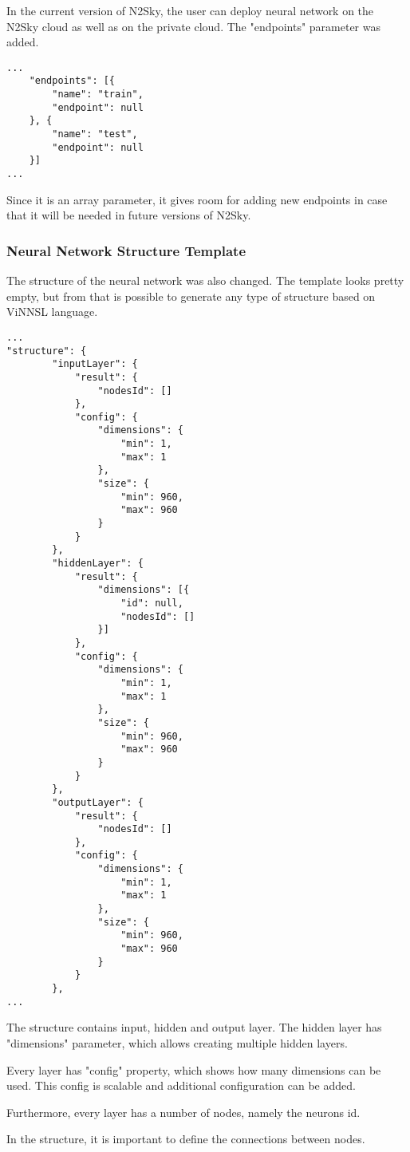 In the current version of N2Sky, the user can deploy neural network on the N2Sky cloud as well as on the private cloud. The "endpoints" parameter was added.

\begin{lstlisting}[caption=ViNNSL template environment]
...
    "endpoints": [{
        "name": "train",
        "endpoint": null
    }, {
        "name": "test",
        "endpoint": null
    }]
...
\end{lstlisting}

Since it is an array parameter, it gives room for adding new endpoints in case that it will be needed in future versions of N2Sky.

\subsubsection{Neural Network Structure Template}\label{Neural Network Structure Template}

The structure of the neural network was also changed. The template looks pretty empty, but from that is possible to generate any type of structure based on ViNNSL language. 

\begin{lstlisting}[caption=ViNNSL template structure]
...
"structure": {
		"inputLayer": {
			"result": {
				"nodesId": []
			},
			"config": {
				"dimensions": {
					"min": 1,
					"max": 1
				},
				"size": {
					"min": 960,
					"max": 960
				}
			}
		},
		"hiddenLayer": {
			"result": {
				"dimensions": [{
					"id": null,
					"nodesId": []
				}]
			},
			"config": {
				"dimensions": {
					"min": 1,
					"max": 1
				},
				"size": {
					"min": 960,
					"max": 960
				}
			}
		},
		"outputLayer": {
			"result": {
				"nodesId": []
			},
			"config": {
				"dimensions": {
					"min": 1,
					"max": 1
				},
				"size": {
					"min": 960,
					"max": 960
				}
			}
		},
...
\end{lstlisting}

The structure contains input, hidden and output layer. The hidden layer has "dimensions" parameter, which allows creating multiple hidden layers.

Every layer has "config" property, which shows how many dimensions can be used. This config is scalable and additional configuration can be added. 
 
 Furthermore, every layer has a number of nodes, namely the neurons id.  
 
 In the structure, it is important to define the connections between nodes. 
 

